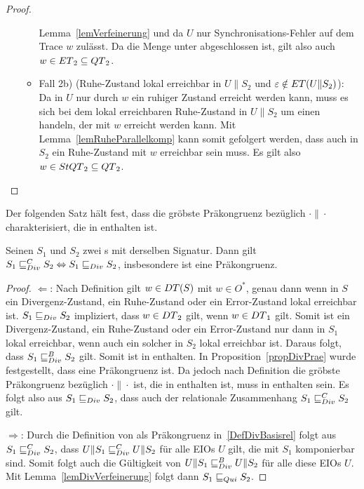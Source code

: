 \begin{proof}
\begin{itemize}
\begin{itemize}
          Lemma~\ref{lemVerfeinerung} und da $U$ nur Synchronisations-Fehler
          auf dem Trace $w$ zulässt. Da die Menge \ET{} unter \cont{}
          abgeschlossen ist, gilt also auch $w\in ET{}_2\subseteq QT{}_2$.
        \item Fall 2b) (Ruhe-Zustand lokal erreichbar in $U\|S_2$ und
          $\varepsilon\notin ET{}(U\|S_2)$): Da in $U$
          nur durch $w$ ein ruhiger Zustand erreicht werden kann, muss es sich
          bei dem lokal erreichbaren Ruhe-Zustand in $U\|S_2$ um einen handeln,
          der mit $w$ erreicht werden kann. Mit Lemma~\ref{lemRuheParallelkomp}
          kann somit gefolgert werden, dass auch in $S_2$ ein Ruhe-Zustand mit
          $w$ erreichbar sein muss. Es gilt also $w\in StQT{}_2\subseteq
          QT{}_2$.
      \end{itemize}
  \end{itemize}
\end{proof}

Der folgenden Satz hält fest, dass \DRel{} die gröbste Präkongruenz bezüglich
$\cdot\|\cdot$ charakterisiert, die in \DBRel{} enthalten ist.

\begin{satz}
\label{satzDivFullAbst}
  Seinen $S_1$ und $S_2$ zwei \EIO{}s mit derselben Signatur. Dann gilt $S_1
  \sqsubseteq _{Div}^C{} S_2\Leftrightarrow S_1\sqsubseteq _{Div}{} S_2$, insbesondere ist \DRel{} eine
  Präkongruenz.
\end{satz}

\begin{proof}
  \glqq{}$\Leftarrow$\grqq{}: Nach Definition gilt $w\in DT{}(S)$ mit $w\in
  O^*$, genau dann wenn in $S$ ein Divergenz-Zustand, ein Ruhe-Zustand oder ein
  Error-Zustand lokal erreichbar ist. $S_1\sqsubseteq _{Div} S_2$ impliziert, dass
  $w\in DT{}_2$ gilt, wenn $w\in DT{}_1$ gilt. Somit ist ein Divergenz-Zustand,
  ein Ruhe-Zustand oder ein Error-Zustand nur dann in $S_1$ lokal erreichbar,
  wenn auch ein solcher in $S_2$ lokal erreichbar ist. Daraus folgt, dass
  $S_1\sqsubseteq _{Div}^B S_2$ gilt. Somit ist \DRel{} in \DBRel{} enthalten. In
  Proposition~\ref{propDivPrae} wurde festgestellt, dass \DRel{} eine
  Präkongruenz ist. Da jedoch \DCRel{} nach Definition die gröbste Präkongruenz
  bezüglich $\cdot\|\cdot$ ist, die in \DBRel{} enthalten ist, muss \DRel{} in
  \DCRel{} enthalten sein. Es folgt also aus $S_1\sqsubseteq _{Div} S_2$,
  dass auch der relationale Zusammenhang $S_1\sqsubseteq _{Div}^C S_2$ gilt.

  \glqq{}$\Rightarrow$\grqq{}: Durch die Definition von \DCRel{} als
  Präkongruenz in~\ref{DefDivBasisrel} folgt aus $S_1\sqsubseteq _{Div}^C{} S_2$, dass
  $U\|S_1\sqsubseteq _{Div}^C U\|S_2$ für alle EIOs $U$ gilt, die mit $S_1$ komponierbar sind.
  Somit folgt auch die Gültigkeit von $U\|S_1\sqsubseteq _{Div}^B U\|S_2$ für alle diese EIOs
  $U$. Mit Lemma~\ref{lemDivVerfeinerung} folgt dann $S_1\sqsubseteq _{Qui}{} S_2$.
\end{proof}

